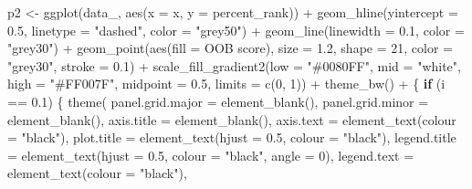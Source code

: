 \documentclass[
  11pt,
  oneside]{book}
\newenvironment{Shaded}{\begin{snugshade}}{\end{snugshade}}
\newcommand{\AttributeTok}[1]{\textcolor[rgb]{0.77,0.63,0.00}{#1}}
\newcommand{\ControlFlowTok}[1]{\textcolor[rgb]{0.13,0.29,0.53}{\textbf{#1}}}
\newcommand{\DecValTok}[1]{\textcolor[rgb]{0.00,0.00,0.81}{#1}}
\newcommand{\FloatTok}[1]{\textcolor[rgb]{0.00,0.00,0.81}{#1}}
\newcommand{\FunctionTok}[1]{\textcolor[rgb]{0.00,0.00,0.00}{#1}}
\newcommand{\NormalTok}[1]{#1}
\newcommand{\OtherTok}[1]{\textcolor[rgb]{0.56,0.35,0.01}{#1}}
\newcommand{\SpecialCharTok}[1]{\textcolor[rgb]{0.00,0.00,0.00}{#1}}
\newcommand{\StringTok}[1]{\textcolor[rgb]{0.31,0.60,0.02}{#1}}
\begin{document}
\begin{Shaded}
\begin{Highlighting}[]
\NormalTok{  p2 }\OtherTok{\textless{}{-}} \FunctionTok{ggplot}\NormalTok{(data\_, }\FunctionTok{aes}\NormalTok{(}\AttributeTok{x =}\NormalTok{ x, }\AttributeTok{y =} \StringTok{\textasciigrave{}}\AttributeTok{percent\_rank}\StringTok{\textasciigrave{}}\NormalTok{)) }\SpecialCharTok{+}
    \FunctionTok{geom\_hline}\NormalTok{(}\AttributeTok{yintercept =} \FloatTok{0.5}\NormalTok{, }\AttributeTok{linetype =} \StringTok{"dashed"}\NormalTok{, }\AttributeTok{color =} \StringTok{"grey50"}\NormalTok{) }\SpecialCharTok{+}
    \FunctionTok{geom\_line}\NormalTok{(}\AttributeTok{linewidth =} \FloatTok{0.1}\NormalTok{, }\AttributeTok{color =} \StringTok{"grey30"}\NormalTok{) }\SpecialCharTok{+}
    \FunctionTok{geom\_point}\NormalTok{(}\FunctionTok{aes}\NormalTok{(}\AttributeTok{fill =} \StringTok{\textasciigrave{}}\AttributeTok{OOB score}\StringTok{\textasciigrave{}}\NormalTok{), }\AttributeTok{size =} \FloatTok{1.2}\NormalTok{, }\AttributeTok{shape =} \DecValTok{21}\NormalTok{, }\AttributeTok{color =} \StringTok{"grey30"}\NormalTok{, }\AttributeTok{stroke =} \FloatTok{0.1}\NormalTok{) }\SpecialCharTok{+}
    \FunctionTok{scale\_fill\_gradient2}\NormalTok{(}\AttributeTok{low =} \StringTok{"\#0080FF"}\NormalTok{, }\AttributeTok{mid =} \StringTok{"white"}\NormalTok{, }\AttributeTok{high =} \StringTok{"\#FF007F"}\NormalTok{, }\AttributeTok{midpoint =} \FloatTok{0.5}\NormalTok{, }\AttributeTok{limits =} \FunctionTok{c}\NormalTok{(}\DecValTok{0}\NormalTok{, }\DecValTok{1}\NormalTok{)) }\SpecialCharTok{+}
    \FunctionTok{theme\_bw}\NormalTok{() }\SpecialCharTok{+}
\NormalTok{    \{}
      \ControlFlowTok{if}\NormalTok{ (i }\SpecialCharTok{==} \FloatTok{0.1}\NormalTok{) \{}
        \FunctionTok{theme}\NormalTok{(}
          \AttributeTok{panel.grid.major =} \FunctionTok{element\_blank}\NormalTok{(),}
          \AttributeTok{panel.grid.minor =} \FunctionTok{element\_blank}\NormalTok{(),}
          \AttributeTok{axis.title =} \FunctionTok{element\_blank}\NormalTok{(),}
          \AttributeTok{axis.text =} \FunctionTok{element\_text}\NormalTok{(}\AttributeTok{colour =} \StringTok{"black"}\NormalTok{),}
          \AttributeTok{plot.title =} \FunctionTok{element\_text}\NormalTok{(}\AttributeTok{hjust =} \FloatTok{0.5}\NormalTok{, }\AttributeTok{colour =} \StringTok{"black"}\NormalTok{),}
          \AttributeTok{legend.title =} \FunctionTok{element\_text}\NormalTok{(}\AttributeTok{hjust =} \FloatTok{0.5}\NormalTok{, }\AttributeTok{colour =} \StringTok{"black"}\NormalTok{, }\AttributeTok{angle =} \DecValTok{0}\NormalTok{),}
          \AttributeTok{legend.text =} \FunctionTok{element\_text}\NormalTok{(}\AttributeTok{colour =} \StringTok{"black"}\NormalTok{),}

\end{Highlighting}
\end{Shaded}
\end{document}
